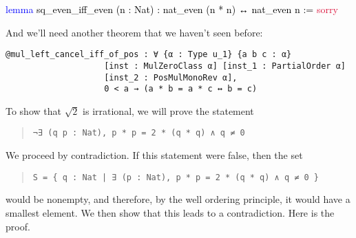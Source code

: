 \documentclass[
  letterpaper,
  DIV=11,
  numbers=noendperiod]{scrreprt}
\newenvironment{Shaded}{\begin{snugshade}}{\end{snugshade}}
\newcommand{\ConstantTok}[1]{\textcolor[rgb]{0.56,0.35,0.01}{#1}}
\newcommand{\KeywordTok}[1]{\textcolor[rgb]{0.00,0.23,0.31}{#1}}
\newcommand{\NormalTok}[1]{\textcolor[rgb]{0.00,0.23,0.31}{#1}}
\renewcommand{\NormalTok}[1]{\textcolor[HTML]{000000}{#1}}
\renewcommand{\KeywordTok}[1]{\textcolor[HTML]{0000FF}{#1}}
\renewcommand{\ConstantTok}[1]{\textcolor[HTML]{DC143C}{#1}}
\newenvironment{ind}
	{\begin{list}{}{\setlength{\leftmargin}{1em}}\item\relax}
	{\end{list}}
\theoremstyle{remark}
\begin{document}
\begin{Shaded}
\begin{Highlighting}[]
\KeywordTok{lemma}\NormalTok{ sq\_even\_iff\_even (n : Nat) : nat\_even (n * n) ↔ nat\_even n := }\ConstantTok{sorry}
\end{Highlighting}
\end{Shaded}

And we'll need another theorem that we haven't seen before:

\begin{ind}

\begin{verbatim}
@mul_left_cancel_iff_of_pos : ∀ {α : Type u_1} {a b c : α}
                    [inst : MulZeroClass α] [inst_1 : PartialOrder α]
                    [inst_2 : PosMulMonoRev α],
                    0 < a → (a * b = a * c ↔ b = c)
\end{verbatim}

\end{ind}

To show that \(\sqrt{2}\) is irrational, we will prove the statement

\begin{quote}

\begin{verbatim}
¬∃ (q p : Nat), p * p = 2 * (q * q) ∧ q ≠ 0
\end{verbatim}

\end{quote}

We proceed by contradiction. If this statement were false, then the set

\begin{quote}

\begin{verbatim}
S = { q : Nat | ∃ (p : Nat), p * p = 2 * (q * q) ∧ q ≠ 0 }
\end{verbatim}

\end{quote}

would be nonempty, and therefore, by the well ordering principle, it
would have a smallest element. We then show that this leads to a
contradiction. Here is the proof.
\end{document}
